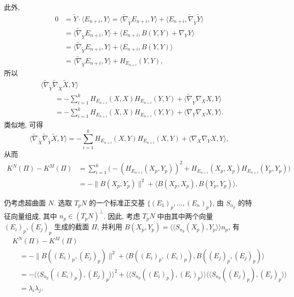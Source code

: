 \begin{RiemannProof}
\[\]
此外,
\begin{align*}
  0&=\widetilde Y\cdot\langle E_{n+i},Y\rangle
    =\langle\widetilde\nabla_{\widetilde Y}E_{n+i},Y\rangle
    +\langle E_{n+i},\widetilde\nabla_{\widetilde Y}\widetilde Y\rangle\\
  &=\langle\widetilde\nabla_{\widetilde Y}E_{n+i},Y\rangle+\langle E_{n+i},B(Y,Y)+\nabla_YY\rangle\\
  &=\langle\widetilde\nabla_{\widetilde Y}E_{n+i},Y\rangle+\langle E_{n+i},B(Y,Y)\rangle\\
  &=\langle\widetilde\nabla_{\widetilde Y}E_{n+i},Y\rangle+H_{E_{n+i}}(Y,Y),
\end{align*}
所以
\begin{align*}
 &\langle\widetilde\nabla_{\widetilde Y}\widetilde\nabla_{\widetilde X}\widetilde X,Y\rangle\\
 &\qquad=-\sum_{i=1}^k H_{E_{n+i}}(X,X)H_{E_{n+i}}(Y,Y)
    +\langle\widetilde\nabla_{\widetilde Y}\nabla_XX,Y\rangle\\
 &\qquad=-\sum_{i=1}^k H_{E_{n+i}}(X,X)H_{E_{n+i}}(Y,Y)+\langle\nabla_Y\nabla_XX,Y\rangle.
\end{align*}
类似地, 可得
\[
  \langle\widetilde\nabla_{\widetilde X}\widetilde\nabla_{\widetilde Y}\widetilde X,Y\rangle
  =-\sum_{i=1}^k H_{E_{n+i}}(X,Y)H_{E_{n+i}}(X,Y)+\langle\nabla_X\nabla_YX,Y\rangle,
\]
从而
\begin{align*}
  K^N(\Pi)-K^M(\Pi)
  &=\sum_{i=1}^k\bigl(-(H_{E_{n+i}}(X_p,Y_p))^2+
     H_{E_{n+i}}(X_p,X_p)H_{E_{n+i}}(Y_p,Y_p)\bigr)\\
  &=-\lVert B(X_p,Y_p)\rVert^2+\langle B(X_p,X_p),B(Y_p,Y_p)\rangle.
\end{align*}
\end{RiemannProof}

\begin{RiemannExample}\label{ex:sectional-curvature-and-principal-curvatures}
仍考虑超曲面 $N$. 选取 $T_pN$ 的一个标准正交基 $\{(E_1)_p,\ldots,(E_n)_p\}$, 由 $S_{n_p}$ 的特征向量组成, 其中 $n_p\in(T_pN)^\perp$. 因此, 考虑 $T_pN$ 中由其中两个向量 $(E_i)_p,(E_j)_p$ 生成的截面 $\Pi$, 并利用 $B(X_p,Y_p)=\langle\!\langle S_{n_p}(X_p),Y_p\rangle\!\rangle n_p$, 有
\begin{align*}
  &K^N(\Pi)-K^M(\Pi)\\
  &\quad=-\lVert B((E_i)_p,(E_j)_p)\rVert^2
    +\langle B((E_i)_p,(E_i)_p),B((E_j)_p,(E_j)_p)\rangle\\
  &\quad=-\langle\!\langle S_{n_p}((E_i)_p),(E_j)_p\rangle\!\rangle^2
     +\langle\!\langle S_{n_p}((E_i)_p),(E_i)_p\rangle\!\rangle
      \langle\!\langle S_{n_p}((E_j)_p),(E_j)_p\rangle\!\rangle\\
  &\quad=\lambda_i\lambda_j.
\end{align*}
\end{RiemannExample}

